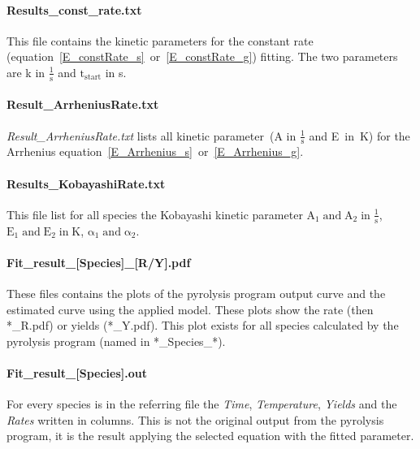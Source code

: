\paragraph{Results\_const\_rate.txt}
This file contains the kinetic parameters for the constant rate (equation~\ref{E_constRate_s}~or~\ref{E_constRate_g}) fitting. The two parameters are k in $\mathrm{\frac{1}{s}}$ and $\mathrm{t_{start}}$ in s.

\paragraph{Result\_ArrheniusRate.txt}
\emph{Result\_ArrheniusRate.txt} lists all kinetic parameter~(A in $\mathrm{\frac{1}{s}}$ and E~in~K) for the Arrhenius equation~\ref{E_Arrhenius_s}~or~\ref{E_Arrhenius_g}.

\paragraph{Results\_KobayashiRate.txt}
This file list for all species the Kobayashi kinetic parameter $\mathrm{A_1 \; and \; A_2 \; in \; \frac{1}{s}}$, $\mathrm{E_1 \; and \; E_2 \; in \; K}$, $\mathrm{\alpha_1 \; and \; \alpha_2}$.

\paragraph{Fit\_result\_[Species]\_[R/Y].pdf}
These files contains the plots of the pyrolysis program output curve and the estimated curve using the applied model. These plots show the rate (then *\_R.pdf) or yields (*\_Y.pdf). This plot exists for all species calculated by the pyrolysis program (named in *\_Species\_*).

\paragraph{Fit\_result\_[Species].out}
For every species is in the referring file the \emph{Time}, \emph{Temperature}, \emph{Yields} and the \emph{Rates} written in columns. This is not the original output from the pyrolysis program, it is the result applying the selected equation with the fitted parameter.

